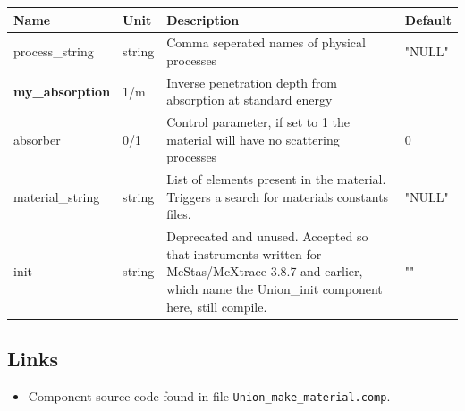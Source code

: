 \begin{longtable}{p{}p{}p{}p{}}
\toprule
\textbf{Name} & \textbf{Unit} & \textbf{Description} & \textbf{Default} \\
\midrule
\endhead
process\_string & string & Comma seperated names of physical processes & "NULL" \\
\textbf{my\_absorption} & 1/m & Inverse penetration depth from absorption at standard energy &  \\
absorber & 0/1 & Control parameter, if set to 1 the material will have no scattering processes & 0 \\
material\_string & string & List of elements present in the material. Triggers a search for materials constants files. & "NULL" \\
init & string & Deprecated and unused. Accepted so that instruments written for McStas/McXtrace 3.8.7 and earlier, which name the Union\_init component here, still compile. & "" \\
\bottomrule
\end{longtable}

\subsection*{Links}
\begin{itemize}
  \item Component source code found in file \texttt{Union\_make\_material.comp}.
\end{itemize}
